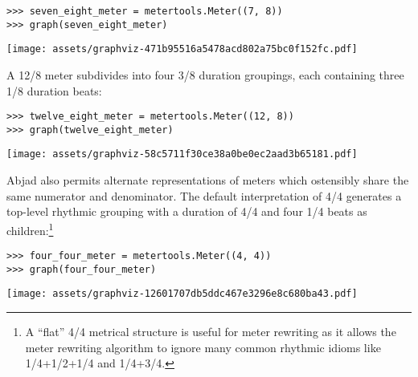 \begin{abjadbookoutput}
\begin{singlespacing}
\vspace{-0.5\baselineskip}
\begin{verbatim}
>>> seven_eight_meter = metertools.Meter((7, 8))
>>> graph(seven_eight_meter)
\end{verbatim}
\noindent\texttt{[image: assets/graphviz-471b95516a5478acd802a75bc0f152fc.pdf]}
\end{singlespacing}
\end{abjadbookoutput}

\noindent A 12/8 meter subdivides into four 3/8 duration groupings, each
containing three 1/8 duration beats:

\begin{comment}
<abjad>
twelve_eight_meter = metertools.Meter((12, 8))
graph(twelve_eight_meter)
</abjad>
\end{comment}

\begin{abjadbookoutput}
\begin{singlespacing}
\vspace{-0.5\baselineskip}
\begin{verbatim}
>>> twelve_eight_meter = metertools.Meter((12, 8))
>>> graph(twelve_eight_meter)
\end{verbatim}
\noindent\texttt{[image: assets/graphviz-58c5711f30ce38a0be0ec2aad3b65181.pdf]}
\end{singlespacing}
\end{abjadbookoutput}

\noindent Abjad also permits alternate representations of meters which
ostensibly share the same numerator and denominator. The default interpretation
of 4/4 generates a top-level rhythmic grouping with a duration of 4/4 and four
1/4 beats as children:\footnote{A \enquote{flat} 4/4 metrical structure is
useful for meter rewriting as it allows the meter rewriting algorithm to ignore
many common rhythmic idioms like 1/4+1/2+1/4 and 1/4+3/4.}

\begin{comment}
<abjad>
four_four_meter = metertools.Meter((4, 4))
graph(four_four_meter)
</abjad>
\end{comment}

\begin{abjadbookoutput}
\begin{singlespacing}
\vspace{-0.5\baselineskip}
\begin{verbatim}
>>> four_four_meter = metertools.Meter((4, 4))
>>> graph(four_four_meter)
\end{verbatim}
\noindent\texttt{[image: assets/graphviz-12601707db5ddc467e3296e8c680ba43.pdf]}
\end{singlespacing}
\end{abjadbookoutput}

